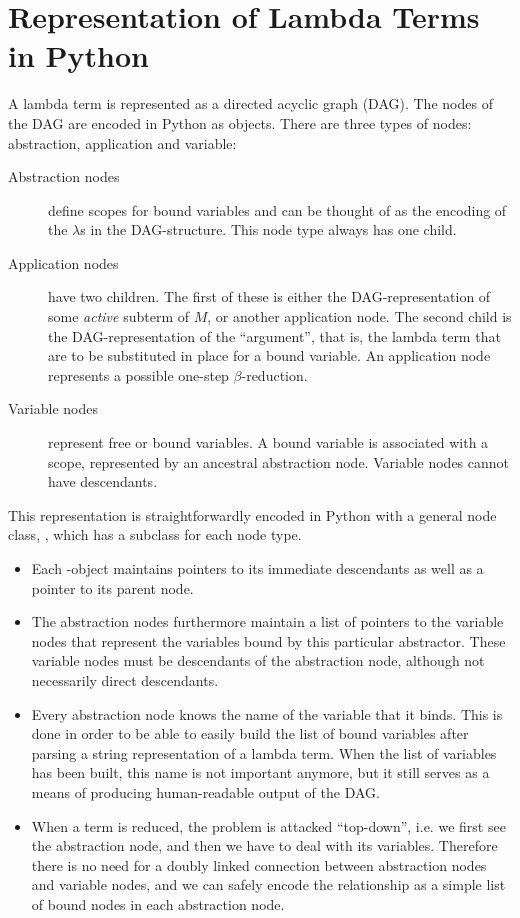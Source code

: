 
\chapter{Representation of Lambda Terms in Python}

A lambda term is represented as a directed acyclic graph (DAG). The nodes of the
DAG are encoded in Python as objects. There are three types of nodes: 
abstraction, application and variable:
\begin{description}
	\item[Abstraction nodes] define scopes for bound variables and can be thought
	of as the encoding of the $\lambda$s in the DAG-structure. This node type
	always has one child.
	
	\item[Application nodes] have two children. The first of these
	is either the DAG-representation of some \emph{active} subterm of 
	$M$, or another application node. The second child is the DAG-representation
	of the ``argument'', that is, the lambda term that are to be substituted
	in place for a bound variable. An application node represents a possible
	one-step $\beta$-reduction.
	
	\item[Variable nodes] represent free or bound variables. A bound 
	variable is associated with a scope, represented by an ancestral
	abstraction node. Variable nodes cannot have descendants.
\end{description}

This representation is straightforwardly encoded in Python with a general node
class, , which has a subclass for each node type.
\begin{itemize}
	\item Each -object maintains pointers to its immediate 
	descendants as well as a pointer to its parent node.
	
	\item The abstraction nodes furthermore maintain a list of pointers to the
	variable nodes that represent the variables bound by this particular abstractor.
	These variable nodes must be descendants of the abstraction node, although 
	not necessarily direct descendants.
	
	\item Every abstraction node knows the name of the variable that it binds.
	This is done in order to be able to easily build the list of bound 
	variables after parsing a string representation of a lambda term. When
	the list of variables has been built, this name is not important anymore, 
	but it still serves as a means of producing human-readable output of the DAG.
	
	\item When a term is reduced, the problem is attacked ``top-down'', i.e. we first
	see the abstraction node, and then we have to deal with its variables.
	Therefore there is no need for a doubly linked connection between abstraction
	nodes and variable nodes, and we can safely encode the relationship as a simple
	list of bound nodes in each abstraction node.
\end{itemize}

